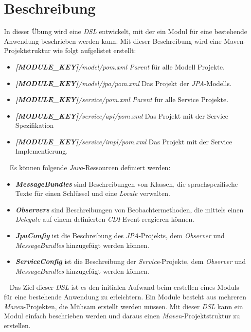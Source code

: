 \section{Beschreibung}
In dieser Übung wird eine \emph{DSL} entwickelt, mit der ein Modul für eine bestehende Anwendung beschrieben werden kann. Mit dieser Beschreibung wird eine Maven-Projektstruktur wie folgt aufgelistet erstellt:
\begin{itemize}
	\item\emph{\textbf{[MODULE\_KEY]}/model/pom.xml}
	\newline
	\emph{Parent} für alle Modell Projekte.
	
	\item\emph{\textbf{[MODULE\_KEY]}/model/jpa/pom.xml}
	\newline
	Das Projekt der \emph{JPA}-Modells.
	
	\item\emph{\textbf{[MODULE\_KEY]}/service/pom.xml}
	\newline
	\emph{Parent} für alle Service Projekte.
	
	\item\emph{\textbf{[MODULE\_KEY]}/service/api/pom.xml}
	\newline
	Das Projekt mit der Service Spezifikation

	\item\emph{\textbf{[MODULE\_KEY]}/service/impl/pom.xml}
	\newline
	Das Projekt mit der Service Implementierung.
\end{itemize}
\ \newline
Es können folgende \emph{Java}-Ressourcen definiert werden:
\begin{itemize}
	\item\textbf{\emph{MessageBundles}} sind Beschreibungen von Klassen, die sprachspezifische Texte für einen Schlüssel und eine \emph{Locale} verwalten.
	
	\item\textbf{\emph{Observers}} sind Beschreibungen von Beobachtermethoden, die mittels einen \emph{Delegate} auf einem definierten \emph{CDI}-Event reagieren können.
	
	\item\textbf{\emph{JpaConfig}} ist die Beschreibung des \emph{JPA}-Projekts, dem \emph{Observer} und \emph{MessageBundles} hinzugefügt werden können.
	
	\item\textbf{\emph{ServiceConfig}} ist die Beschreibung der \emph{Service}-Projekte, dem \emph{Observer} und \emph{MessageBundles} hinzugefügt werden können.
\end{itemize}
\ \newline
Das Ziel dieser \emph{DSL} ist es den initialen Aufwand beim erstellen eines Moduls für eine bestehende Anwendung zu erleichtern. Ein Module besteht aus mehreren \emph{Maven}-Projekten, die Mühsam erstellt werden müssen. Mit dieser \emph{DSL} kann ein Modul einfach beschrieben werden und daraus einen \emph{Maven}-Projektstruktur zu erstellen.

